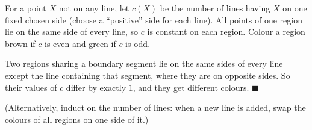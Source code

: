 For a point $X$ not on any line, let $c(X)$ be the number of lines having $X$ on one fixed chosen side (choose a ``positive'' side for each line). All points of one region lie on the same side of every line, so $c$ is constant on each region. Colour a region brown if $c$ is even and green if $c$ is odd.

Two regions sharing a boundary segment lie on the same sides of every line except the line containing that segment, where they are on opposite sides. So their values of $c$ differ by exactly $1$, and they get different colours. $\blacksquare$

(Alternatively, induct on the number of lines: when a new line is added, swap the colours of all regions on one side of it.)
